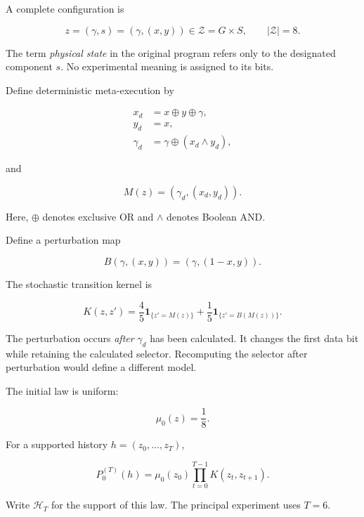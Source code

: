 \documentclass[11pt]{article}
\theoremstyle{remark}
\newcommand{\ind}{\mathbf{1}}
\newcommand{\Hcal}{\mathcal{H}}
\newcommand{\Zcal}{\mathcal{Z}}
\begin{document}
A complete configuration is

\begin{equation}
z=(\gamma,s)=(\gamma,(x,y))
\in\Zcal=G\times S,
\qquad
|\Zcal|=8.
\end{equation}

The term \emph{physical state} in the original program refers only to the designated component \(s\). No experimental meaning is assigned to its bits.

Define deterministic meta-execution by

\begin{align}
x_d &= x\oplus y\oplus\gamma,\\
y_d &= x,\\
\gamma_d &= \gamma\oplus(x_d\land y_d),
\end{align}

and

\begin{equation}
M(z)=(\gamma_d,(x_d,y_d)).
\end{equation}

Here, \(\oplus\) denotes exclusive OR and \(\land\) denotes Boolean AND.

Define a perturbation map

\begin{equation}
B(\gamma,(x,y))=(\gamma,(1-x,y)).
\end{equation}

The stochastic transition kernel is

\begin{equation}
K(z,z')
=
\frac45\ind_{\{z'=M(z)\}}
+
\frac15\ind_{\{z'=B(M(z))\}}.
\end{equation}

The perturbation occurs \emph{after} \(\gamma_d\) has been calculated. It changes the first data bit while retaining the calculated selector. Recomputing the selector after perturbation would define a different model.

The initial law is uniform:

\begin{equation}
\mu_0(z)=\frac18.
\end{equation}

For a supported history \(h=(z_0,\ldots,z_T)\),

\begin{equation}
P_0^{(T)}(h)
=
\mu_0(z_0)
\prod_{t=0}^{T-1}K(z_t,z_{t+1}).
\end{equation}

Write \(\Hcal_T\) for the support of this law. The principal experiment uses \(T=6\).
\end{document}
